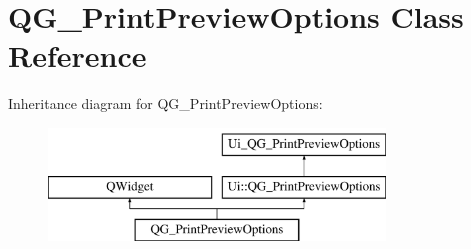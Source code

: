 \hypertarget{classQG__PrintPreviewOptions}{\section{Q\-G\-\_\-\-Print\-Preview\-Options Class Reference}
\label{classQG__PrintPreviewOptions}
}
Inheritance diagram for Q\-G\-\_\-\-Print\-Preview\-Options\-:\begin{figure}[H]
\begin{center}
\leavevmode
\includegraphics[height=3.000000cm]{classQG__PrintPreviewOptions}
\end{center}
\end{figure}
